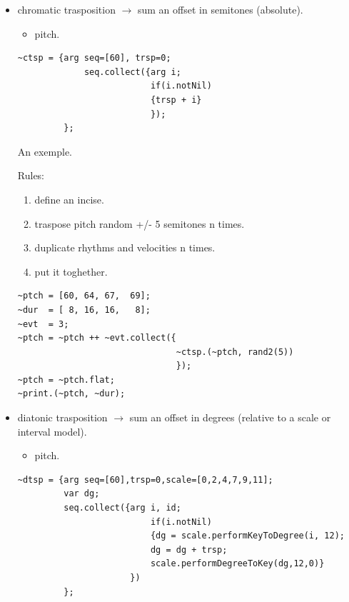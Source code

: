 \begin{itemize}
\tightlist
\item chromatic trasposition \(\rightarrow\) sum an offset in semitones (absolute).
    \begin{itemize}
    \tightlist
    \item pitch.
    \end{itemize}

\begin{lstlisting}[frame=single, caption=chromatic transposition function] 
~ctsp = {arg seq=[60], trsp=0;
             seq.collect({arg i; 
                          if(i.notNil) 
                          {trsp + i} 
                          });
         };
\end{lstlisting}

An exemple.

Rules:
\begin{enumerate}
\tightlist
\item define an incise.
\item traspose pitch random +/- 5 semitones n times.
\item duplicate rhythms and velocities n times.
\item put it toghether.
\end{enumerate}

\begin{lstlisting}[frame=single] 
~ptch = [60, 64, 67,  69];
~dur  = [ 8, 16, 16,   8];
~evt  = 3;
~ptch = ~ptch ++ ~evt.collect({ 
                               ~ctsp.(~ptch, rand2(5)) 
                               });
~ptch = ~ptch.flat;
~print.(~ptch, ~dur);
\end{lstlisting}

\item diatonic trasposition \(\rightarrow\) sum an offset in degrees (relative to a scale or interval model).
    \begin{itemize}
    \tightlist
    \item pitch.
    \end{itemize}

\begin{lstlisting}[frame=single, caption=diatonic transposition function] 
~dtsp = {arg seq=[60],trsp=0,scale=[0,2,4,7,9,11];
         var dg;
         seq.collect({arg i, id;
		                  if(i.notNil)
		                  {dg = scale.performKeyToDegree(i, 12);
		                  dg = dg + trsp;
		                  scale.performDegreeToKey(dg,12,0)}
		              })
         };
\end{lstlisting}


\end{itemize}

